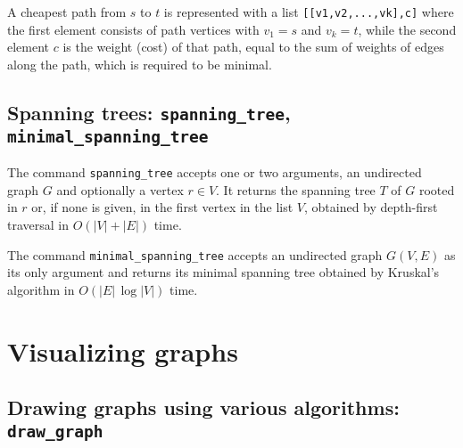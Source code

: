 \documentclass[a4paper,11pt]{article}
\begin{document}
A cheapest path from $ s $ to $ t $ is represented with a list {\tt [[v1,v2,...,vk],c]} where the first element consists of path vertices with $ v_1=s $ and $ v_k=t $, while the second element $ c $ is the weight (cost) of that path, equal to the sum of weights of edges along the path, which is required to be minimal.

\subsection{Spanning trees: {\tt spanning\_tree}, {\tt minimal\_spanning\_tree}}

The command {\tt spanning\_tree} accepts one or two arguments, an undirected graph $ G $ and optionally a vertex $ r\in V $. It returns the spanning tree $ T $ of $ G $ rooted in $ r $ or, if none is given, in the first vertex in the list $ V $, obtained by depth-first traversal in $ O(|V|+|E|) $ time.

The command {\tt minimal\_spanning\_tree} accepts an undirected graph $ G(V,E) $ as its only argument and returns its minimal spanning tree obtained by Kruskal's algorithm in $ O(|E|\,\log|V|) $ time.

\section{Visualizing graphs}

\subsection{Drawing graphs using various algorithms: {\tt draw\_graph}}
\end{document}
